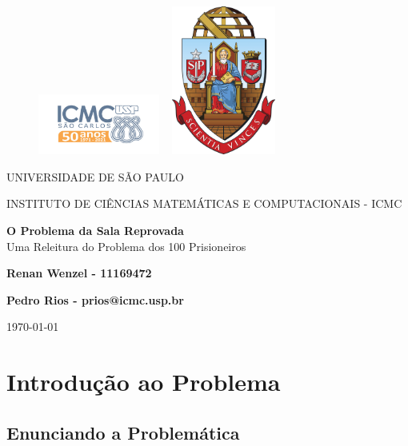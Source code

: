 \documentclass{article}
\begin{document}
\begin{figure}[ht]
		\includegraphics[width=4cm]{../../icmc.png}
		\hspace{5cm}
		\includegraphics[height=4.9cm,width=4cm]{../../brasao_usp_cor.jpg}
	\endminipage	
\end{figure}

    \begin{center}
        \vspace{1cm}
        \LARGE
        UNIVERSIDADE DE S\~AO PAULO

        \vspace{1.3cm}
        \LARGE
        INSTITUTO DE CI\^ENCIAS MATEM\'ATICAS E COMPUTACIONAIS - ICMC

        \vspace{1.7cm}
        \Large
        \textbf{O Problema da Sala Reprovada}\\ 
        \large Uma Releitura do Problema dos 100 Prisioneiros

        \vspace{1.3cm}
        \large
        \textbf{Renan Wenzel - 11169472}

        \vspace{1.3cm}
        \large
        \textbf{Pedro Rios - prios@icmc.usp.br}

        \vspace{1.3cm}
        \today
    \end{center}
    \newpage  
    
    \tableofcontents
    
    \newpage
    \section{Introdu\c c\~ao ao Problema}
    \subsection{Enunciando a Problem\'atica}
\end{document}

